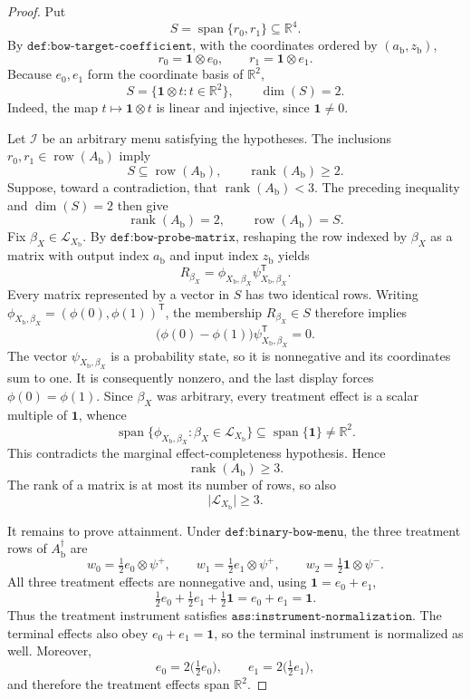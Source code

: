\documentclass{article}
\begin{document}
\begin{proof}
Put
\[
S=\operatorname{span}\{r_0,r_1\}\subseteq\mathbb R^4.
\]
By \(\texttt{def:bow-target-coefficient}\), with the coordinates ordered by
\((a_{\mathrm b},z_{\mathrm b})\),
\[
r_0=\mathbf 1\otimes e_0,
\qquad
r_1=\mathbf 1\otimes e_1.
\]
Because \(e_0,e_1\) form the coordinate basis of \(\mathbb R^2\),
\[
S=\{\mathbf 1\otimes t:t\in\mathbb R^2\},
\qquad
\dim(S)=2.
\]
Indeed, the map \(t\mapsto\mathbf 1\otimes t\) is linear and injective,
since \(\mathbf 1\neq0\).

Let \(\mathcal I\) be an arbitrary menu satisfying the hypotheses.  The
inclusions \(r_0,r_1\in\operatorname{row}(A_{\mathrm b})\) imply
\[
S\subseteq\operatorname{row}(A_{\mathrm b}),
\qquad
\operatorname{rank}(A_{\mathrm b})\geq2.
\]
Suppose, toward a contradiction, that
\(\operatorname{rank}(A_{\mathrm b})<3\).  The preceding inequality and
\(\dim(S)=2\) then give
\[
\operatorname{rank}(A_{\mathrm b})=2,
\qquad
\operatorname{row}(A_{\mathrm b})=S.
\]
Fix \(\beta_X\in\mathcal L_{X_{\mathrm b}}\).  By
\(\texttt{def:bow-probe-matrix}\), reshaping the row indexed by \(\beta_X\)
as a matrix with output index \(a_{\mathrm b}\) and input index
\(z_{\mathrm b}\) yields
\[
R_{\beta_X}
=\phi_{X_{\mathrm b},\beta_X}
 \psi_{X_{\mathrm b},\beta_X}^{\mathsf T}.
\]
Every matrix represented by a vector in \(S\) has two identical rows.
Writing
\(\phi_{X_{\mathrm b},\beta_X}=(\phi(0),\phi(1))^{\mathsf T}\), the membership
\(R_{\beta_X}\in S\) therefore implies
\[
\bigl(\phi(0)-\phi(1)\bigr)
\psi_{X_{\mathrm b},\beta_X}^{\mathsf T}=0.
\]
The vector \(\psi_{X_{\mathrm b},\beta_X}\) is a probability state, so it is
nonnegative and its coordinates sum to one.  It is consequently nonzero,
and the last display forces \(\phi(0)=\phi(1)\).  Since \(\beta_X\) was
arbitrary, every treatment effect is a scalar multiple of \(\mathbf 1\),
whence
\[
\operatorname{span}\{\phi_{X_{\mathrm b},\beta_X}:
\beta_X\in\mathcal L_{X_{\mathrm b}}\}
\subseteq\operatorname{span}\{\mathbf 1\}
\neq\mathbb R^2.
\]
This contradicts the marginal effect-completeness hypothesis.  Hence
\[
\operatorname{rank}(A_{\mathrm b})\geq3.
\]
The rank of a matrix is at most its number of rows, so also
\[
\lvert\mathcal L_{X_{\mathrm b}}\rvert\geq3.
\]

It remains to prove attainment.  Under \(\texttt{def:binary-bow-menu}\), the
three treatment rows of \(A_{\mathrm b}^{\dagger}\) are
\[
w_0=\tfrac12e_0\otimes\psi^{+},
\qquad
w_1=\tfrac12e_1\otimes\psi^{+},
\qquad
w_2=\tfrac12\mathbf 1\otimes\psi^{-}.
\]
All three treatment effects are nonnegative and, using
\(\mathbf 1=e_0+e_1\),
\[
\tfrac12e_0+\tfrac12e_1+\tfrac12\mathbf 1
=e_0+e_1
=\mathbf 1.
\]
Thus the treatment instrument satisfies
\(\texttt{ass:instrument-normalization}\).  The terminal effects also obey
\(e_0+e_1=\mathbf 1\), so the terminal instrument is normalized as well.
Moreover,
\[
e_0=2\bigl(\tfrac12e_0\bigr),
\qquad
e_1=2\bigl(\tfrac12e_1\bigr),
\]
and therefore the treatment effects span \(\mathbb R^2\).


\end{proof}
\end{document}
